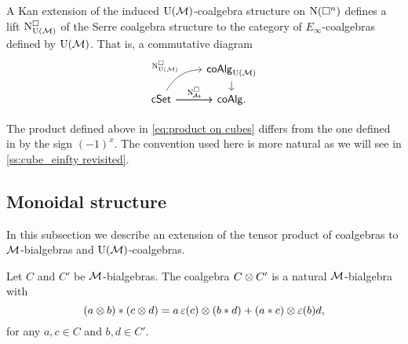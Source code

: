 A Kan extension of the induced ${\operatorname{U}(\mathcal{M})}$-coalgebra structure on $\operatorname{N}(\square^n)$ defines a lift $\operatorname{N^{\square}_{{\operatorname{U}(\mathcal{M})}}}$ of the Serre coalgebra structure to the category of $E_\infty$-coalgebras defined by ${\operatorname{U}(\mathcal{M})}$.
That is, a commutative diagram
\begin{equation}\label{eq:lift to e-infty cubical}
	\begin{tikzcd}[column sep=normal, row sep=small]
		& \coAlg_{\UM} \arrow[d] \\
		\cSet \arrow[r]
		\arrow[ur,out=60, in=180, "\cchainsUM"]
		\arrow[r, "\cchainsA"]
		& \coAlg.
	\end{tikzcd}
\end{equation}

\begin{remark*}
	The product defined above in \cref{eq:product on cubes} differs from the one defined in \cite{medina2022cube_einfty} by the sign $(-1)^x$.
	The convention used here is more natural as we will see in \cref{ss:cube_einfty revisited}.
\end{remark*}

\subsection{Monoidal structure}\label{ss:monoidal structures}

In this subsection we describe an extension of the tensor product of coalgebras to $\mathcal{M}$-bialgebras and ${\operatorname{U}(\mathcal{M})}$-coalgebras.

\begin{lemma}\label{l:monoidal M-bialg}
	Let $C$ and $C'$ be $\mathcal{M}$-bialgebras.
	The coalgebra $C \otimes C'$ is a natural $\mathcal{M}$-bialgebra with
	\begin{equation}\label{eq:monoidal_product}
		(a \otimes b) \ast (c \otimes d) =
		a \operatorname{\varepsilon}(c) \otimes (b \ast d) + (a \ast c) \otimes \operatorname{\varepsilon}(b) d,
	\end{equation}
	for any $a,c \in C$ and $b,d \in C'$.
\end{lemma}

